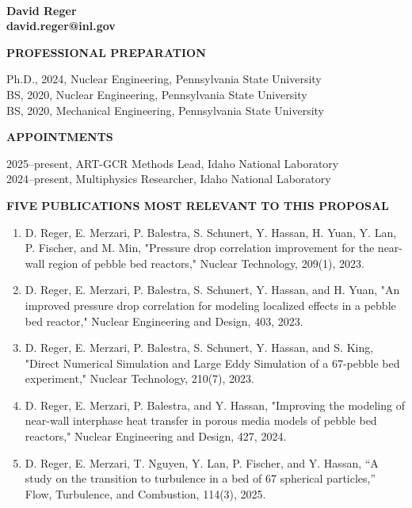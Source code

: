 \documentclass[11pt,letterpaper,english]{article}
\begin{document}
\setlength{\parindent}{0in} %

\pagestyle{fancy}   \renewcommand{%
\headrulewidth}{0.0pt}



\\
{\bf David Reger}\\
{\bf david.reger@inl.gov} \smallskip

\begin{flushleft} {\bf PROFESSIONAL PREPARATION}
{\parindent 16pt

Ph.D., 2024, Nuclear Engineering, Pennsylvania State University  \\ 
BS, 2020, Nuclear Engineering, Pennsylvania State University \\ 
BS, 2020, Mechanical Engineering, Pennsylvania State University \\ 
}

\vspace{.15in}
{\bf APPOINTMENTS}
{\parindent 16pt

2025--present, ART-GCR Methods Lead, Idaho National Laboratory \\
2024--present, Multiphysics Researcher, Idaho National Laboratory \\ 
}

\vspace{.15in}
{\bf FIVE PUBLICATIONS MOST RELEVANT TO THIS PROPOSAL}
\vspace{-6pt}
\begin{enumerate} \itemsep1pt \parskip0pt 
\item D. Reger, E. Merzari, P. Balestra, S. Schunert, Y. Hassan, H. Yuan, Y. Lan, P. Fischer, and M. Min, "Pressure drop correlation improvement for the near-wall region of pebble bed reactors," Nuclear Technology, 209(1), 2023. \\ 
\item D. Reger, E. Merzari, P. Balestra, S. Schunert, Y. Hassan, and H. Yuan, "An improved pressure drop correlation for modeling localized effects in a pebble bed reactor," Nuclear Engineering and Design, 403, 2023. \\ 
\item D. Reger, E. Merzari, P. Balestra, S. Schunert, Y. Hassan, and S. King, "Direct Numerical Simulation and Large Eddy Simulation of a 67-pebble bed experiment," Nuclear Technology, 210(7), 2023. \\ 
\item D. Reger, E. Merzari, P. Balestra, and Y. Hassan, "Improving the modeling of near-wall interphase heat transfer in porous media models of pebble bed reactors," Nuclear Engineering and Design, 427, 2024. \\ 
\item D. Reger, E. Merzari, T. Nguyen, Y. Lan, P. Fischer, and Y. Hassan, “A study on the transition to turbulence in a bed of 67 spherical particles,” Flow, Turbulence, and Combustion, 114(3), 2025.\\ 
\end{enumerate} 


\end{flushleft}
\end{document}

